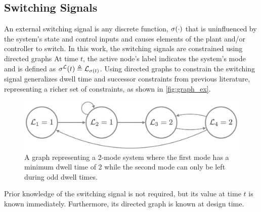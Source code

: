 \subsection{Switching Signals}
An external switching signal is any discrete function, $\ss(\cdot)$ that is uninfluenced by the system's state and control inputs and causes elements of the plant and/or controller to switch. In this work, the switching signals are constrained using directed graphs  At time $t$, the active node's label indicates the system's mode and is defined as $\ssl(t)\triangleq \gnodelabel{\ss(t)}$. Using directed graphs to constrain the switching signal generalizes dwell time and successor constraints from previous literature, representing a richer set of constraints, as shown in \autoref{fig:graph_ex}.

\begin{figure}[h]
\centering
\includegraphics[scale=0.15]{./figures/graph_remark}
\caption{A graph representing a 2-mode system where the first mode has a minimum dwell time of 2 while the second mode can only be left during odd dwell times.}
\label{fig:graph_ex}
\end{figure}

Prior knowledge of the switching signal is not required, but its value at time $t$ is known immediately. Furthermore, its directed graph is known at design time. 
